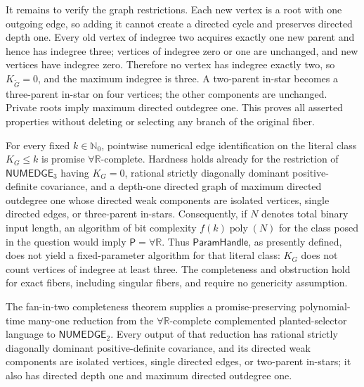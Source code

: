 It remains to verify the graph restrictions.  Each new vertex is a root with one outgoing edge, so adding it cannot create a directed cycle and preserves directed depth one.  Every old vertex of indegree two acquires exactly one new parent and hence has indegree three; vertices of indegree zero or one are unchanged, and new vertices have indegree zero.  Therefore no vertex has indegree exactly two, so \(K_{\widetilde G}=0\), and the maximum indegree is three.  A two-parent in-star becomes a three-parent in-star on four vertices; the other components are unchanged.  Private roots imply maximum directed outdegree one.  This proves all asserted properties without deleting or selecting any branch of the original fiber.

For every fixed \(k\in\mathbb N_0\), pointwise numerical edge identification on the literal class \(K_G\le k\) is promise \(\forall\mathbb R\)-complete.  Hardness holds already for the restriction of \(\mathsf{NUMEDGE}_3\) having \(K_G=0\), rational strictly diagonally dominant positive-definite covariance, and a depth-one directed graph of maximum directed outdegree one whose directed weak components are isolated vertices, single directed edges, or three-parent in-stars.  Consequently, if \(N\) denotes total binary input length, an algorithm of bit complexity \(f(k)\operatorname{poly}(N)\) for the class posed in the question would imply \(\mathsf P=\forall\mathbb R\).  Thus \(\mathsf{ParamHandle}\), as presently defined, does not yield a fixed-parameter algorithm for that literal class: \(K_G\) does not count vertices of indegree at least three.  The completeness and obstruction hold for exact fibers, including singular fibers, and require no genericity assumption.

The fan-in-two completeness theorem supplies a promise-preserving polynomial-time many-one reduction from the \(\forall\mathbb R\)-complete complemented planted-selector language to \(\mathsf{NUMEDGE}_2\).  Every output of that reduction has rational strictly diagonally dominant positive-definite covariance, and its directed weak components are isolated vertices, single directed edges, or two-parent in-stars; it also has directed depth one and maximum directed outdegree one.

